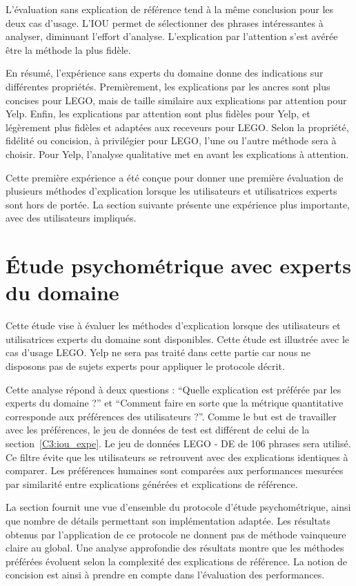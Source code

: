 L'évaluation sans explication de référence tend à la même conclusion pour les deux cas d'usage. L'IOU permet de sélectionner des phrases intéressantes à analyser, diminuant l'effort d'analyse. L'explication par l'attention s'est avérée être la méthode la plus fidèle.

En résumé, l'expérience sans experts du domaine donne des indications sur différentes propriétés. Premièrement, les explications par les ancres sont plus concises pour LEGO, mais de taille similaire aux explications par attention pour Yelp. Enfin, les explications par attention sont plus fidèles pour Yelp, et légèrement plus fidèles et adaptées aux receveurs pour LEGO. Selon la propriété, fidélité ou concision, à privilégier pour LEGO, l'une ou l'autre méthode sera à choisir. Pour Yelp, l'analyse qualitative met en avant les explications à attention.

Cette première expérience a été conçue pour donner une première évaluation de plusieurs méthodes d'explication lorsque les utilisateurs et utilisatrices experts sont hors de portée. La section suivante présente une expérience plus importante, avec des utilisateurs impliqués.

\section{\'Etude psychométrique avec experts du domaine} \label{C3:pus}

Cette étude vise à évaluer les méthodes d'explication lorsque des utilisateurs et utilisatrices experts du domaine sont disponibles.
Cette étude est illustrée avec le cas d'usage LEGO. Yelp ne sera pas traité dans cette partie car nous ne disposons pas de sujets experts pour appliquer le protocole décrit.

Cette analyse répond à deux questions : ``Quelle explication est préférée par les experts du domaine ?'' et ``Comment faire en sorte que la métrique quantitative corresponde aux préférences des utilisateurs ?''.
Comme le but est de travailler avec les préférences, le jeu de données de test est différent de celui de la section~\ref{C3:iou_expe}. Le jeu de données LEGO - DE de 106 phrases sera utilisé. Ce filtre évite que les utilisateurs se retrouvent avec des explications identiques à comparer.
Les préférences humaines sont comparées aux performances mesurées par similarité entre explications générées et explications de référence.

La section fournit une vue d'ensemble du protocole d'étude psychométrique, ainsi que nombre de détails permettant son implémentation adaptée.
Les résultats obtenus par l'application de ce protocole ne donnent pas de méthode vainqueure claire au global. Une analyse approfondie des résultats montre que les méthodes préférées évoluent selon la complexité des explications de référence. La notion de concision est ainsi à prendre en compte dans l'évaluation des performances.

